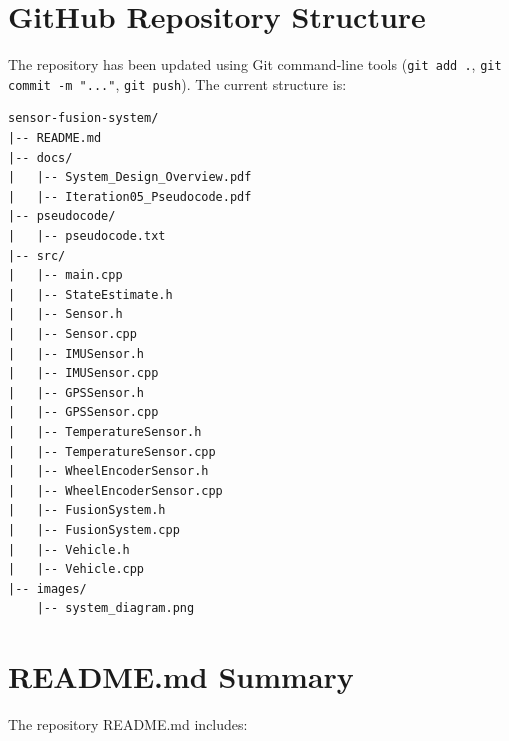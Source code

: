 \documentclass[a4paper,11pt]{article}
\begin{document}
\section{GitHub Repository Structure}

The repository has been updated using Git command-line tools (\texttt{git add .}, \texttt{git commit -m "..."}, \texttt{git push}). The current structure is:

\begin{verbatim}
sensor-fusion-system/
|-- README.md
|-- docs/
|   |-- System_Design_Overview.pdf
|   |-- Iteration05_Pseudocode.pdf
|-- pseudocode/
|   |-- pseudocode.txt
|-- src/
|   |-- main.cpp
|   |-- StateEstimate.h
|   |-- Sensor.h
|   |-- Sensor.cpp
|   |-- IMUSensor.h
|   |-- IMUSensor.cpp
|   |-- GPSSensor.h
|   |-- GPSSensor.cpp
|   |-- TemperatureSensor.h
|   |-- TemperatureSensor.cpp
|   |-- WheelEncoderSensor.h
|   |-- WheelEncoderSensor.cpp
|   |-- FusionSystem.h
|   |-- FusionSystem.cpp
|   |-- Vehicle.h
|   |-- Vehicle.cpp
|-- images/
    |-- system_diagram.png
\end{verbatim}

\section{README.md Summary}

The repository README.md includes:
\end{document}
